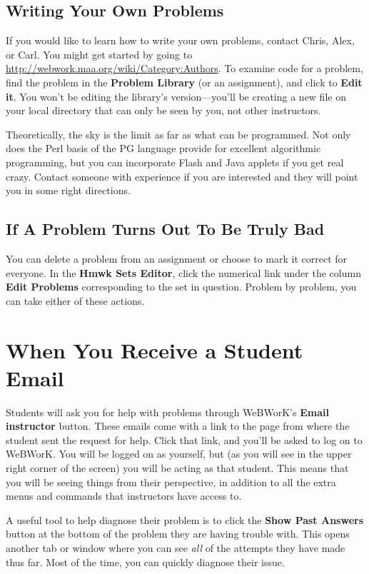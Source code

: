 \documentclass[12pt]{article}
\newcommand{\menu}[1]{\textbf{#1}}
\newcommand{\WW}{WeBWorK}
\newcommand{\HSE}{\menu{Hmwk Sets Editor}}
\begin{document}
\subsection{Writing Your Own Problems}
If you would like to learn how to write your own problems, contact Chris, Alex, or Carl.  You might get started by going to \url{http://webwork.maa.org/wiki/Category:Authors}.  To examine code for a problem, find the problem in the \menu{Problem Library} (or an assignment), and click to \menu{Edit it}.  You won't be editing the library's version---you'll be creating a new file on your local directory that can only be seen by you, not other instructors.

Theoretically, the sky is the limit as far as what can be programmed.  Not only does the Perl basis of the PG language provide for excellent algorithmic programming, but you can incorporate Flash and Java applets if you get real crazy. Contact someone with experience if you are interested and they will point you in some right directions.

\subsection{If A Problem Turns Out To Be Truly Bad}
You can delete a problem from an assignment or choose to mark it correct for everyone.   In the \HSE, click the numerical link under the column \menu{Edit Problems} corresponding to the set in question.  Problem by problem, you can take either of these actions.

\section{When You Receive a Student Email}
Students will ask you for help with problems through \WW's \menu{Email instructor} button.  These emails come with a link to the page from where the student sent the request for help.  Click that link, and you'll be asked to log on to \WW.  You will be logged on as yourself, but (as you will see in the upper right corner of the screen) you will be acting as that student.  This means that you will be seeing things from their perspective, in addition to all the extra menus and commands that instructors have access to.

A useful tool to help diagnose their problem is to click the \menu{Show Past Answers} button at the bottom of the problem they are having trouble with.  This opens another tab or window where you can see \emph{all} of the attempts they have made thus far.  Most of the time, you can quickly diagnose their issue.
\end{document}

